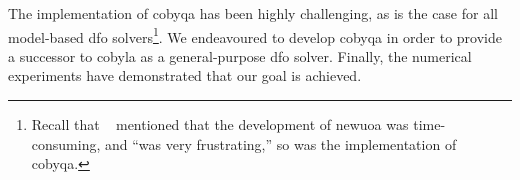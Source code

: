 The implementation of \gls{cobyqa} has been highly challenging, as is the case for all model-based \gls{dfo} solvers\footnote{Recall that \citeauthor{Powell_2006}~\cite{Powell_2006} mentioned that the development of \gls{newuoa} was time-consuming, and \enquote{was very frustrating,} so was the implementation of \gls{cobyqa}.}.
We endeavoured to develop \gls{cobyqa} in order to provide a successor to \gls{cobyla} as a general-purpose \gls{dfo} solver.
Finally, the numerical experiments have demonstrated that our goal is achieved.

